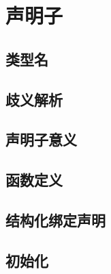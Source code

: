 
\chapter{声明子}

\section{类型名}
\section{歧义解析}
\section{声明子意义}
\section{函数定义}
\section{结构化绑定声明}
\section{初始化}
